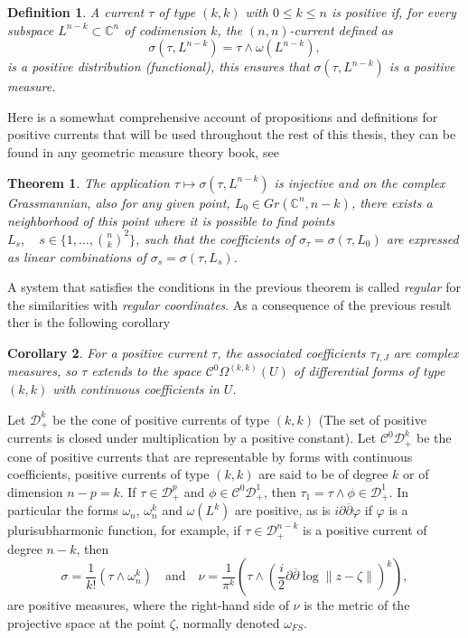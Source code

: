 \documentclass[12pt,twoside,a4paper]{report}
\newtheorem{definition}{Definition}[section]
\newtheorem{theorem}{Theorem}[section]
\newtheorem{cor}[theorem]{Corollary}
\newcommand{\con}{\ensuremath{\mathbb{C}^n}}
\newcommand{\om}{\ensuremath{\Omega}}
\newcommand{\dd}{\ensuremath{\partial\overline{\partial}}}
\newcommand{\csheaf}{\ensuremath{\mathcal C }}
\newcommand{\dsheaf}{\ensuremath{\mathcal D }}
\begin{document}
\begin{definition}\label{positive}
  A current $\tau$ of type $(k,k)$ with $0\leq k\leq n$ is positive if, for every subspace $L^{n-k}\subset\con$ of codimension $k$, the $(n,n)$-current defined as
  \[
    \sigma(\tau,L^{n-k})=\tau\wedge\omega(L^{n-k}),
  \]
  is a positive distribution (functional), this ensures that $\sigma(\tau,L^{n-k})$ is a positive measure.
\end{definition}
\noindent Here is a somewhat comprehensive account of propositions and definitions for positive currents that will be used throughout the rest of this thesis, they can be found in any geometric measure theory book, see \cite{federer}
\begin{theorem}
  The application $\tau\mapsto\sigma(\tau,L^{n-k})$ is injective and on the complex Grassmannian, also for any given point, $L_{0}\in Gr(\con,n-k)$, there exists a neighborhood of this point where it is possible to find points $L_s,\quad s\in\{1,\dots,{n\choose k}^2\}$, such that the coefficients of $\sigma_\tau=\sigma(\tau,L_0)$ are expressed as linear combinations of $\sigma_s=\sigma(\tau,L_s)$.
\end{theorem}
A system that satisfies the conditions in the previous theorem is called \emph{regular} for the similarities with \emph{regular coordinates}. As a consequence of the previous result ther is the following corollary
\begin{cor}
For a positive current $\tau$, the associated coefficients $\tau_{I,J}$ are complex measures, so $\tau$ extends to the space $\csheaf^0\om^{(k,k)}(U)$ of differential forms of type $(k,k)$ with continuous coefficients in $U$.
\end{cor}
Let $\dsheaf_{+}^{k}$ be the cone of positive currents of type $(k,k)$ (The set of positive currents is closed under multiplication by a positive constant). Let $\csheaf^0\dsheaf^{k}_{+}$ be the cone of positive currents that are representable by forms with continuous coefficients, positive currents of type $(k,k)$ are said to be of degree $k$ or of dimension $n-p=k$. If $\tau\in \dsheaf^{p}_{+}$ and $\phi\in\csheaf^0\dsheaf^{1}_+$, then $\tau_1=\tau\wedge\phi\in\dsheaf^{1}_{+}$. In particular the forms $\omega_n$, $\omega^{k}_n$ and $\omega(L^k)$ are positive, as is $i\dd\varphi$ if $\varphi$ is a plurisubharmonic function, for example, if $\tau\in\dsheaf^{n-k}_{+}$ is a positive current of degree $n-k$, then
    \begin{equation}
        \sigma=\frac{1}{k!}(\tau\wedge\omega_n^{k})
        \quad\text{and}\quad
        \nu=\frac{1}{\pi^k}(\tau\wedge\left(\frac{i}{2}\dd\log\| z-\zeta\|\right)^{k}),
    \end{equation}
    are positive measures, where the right-hand side of $\nu$ is the metric of the projective space at the point $\zeta$, normally denoted $\omega_{FS}$.
\end{document}
